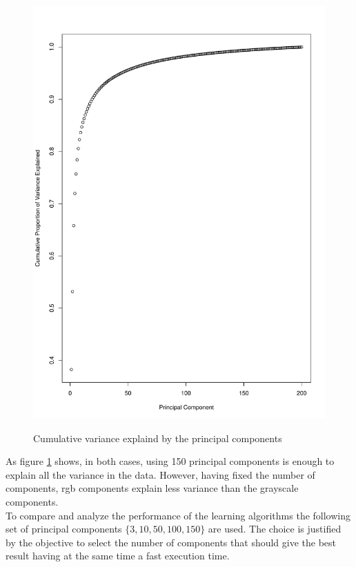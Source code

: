 \documentclass{article}
\begin{document}
\begin{figure}[H]
\begin{adjustwidth}{-4cm}{-4cm}
{    \includegraphics[scale=0.3]{../cumulative_variance_grb.pdf} 
     }
     \centering
     \caption{Cumulative variance explaind by the principal components}  \label{variance}
      \end{adjustwidth} 
   \end{figure}

\noindent As figure \ref{variance} shows, in both cases, using 150 principal components is enough to explain all the variance in the data. However, having fixed the number of components, rgb components explain less variance than the grayscale components.\\
To compare and analyze the performance of the learning algorithms the following set of principal components $\{3,10,50,100,150\}$ are used. The choice is justified by the objective to select the number of components that should give the best result having at the same time a fast execution time. \\
 
\end{document}
